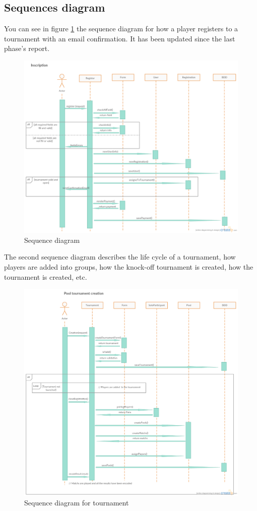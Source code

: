 \documentclass[a4paper, 12pt]{article}
\begin{document}
\subsection*{Sequences diagram}

You can see in figure \ref{playerseq} the sequence diagram for how a player registers to a tournament with an email confirmation. It has been updated since the last phase's report.

\begin{figure}[position]
   \caption{\label{playerseq} Sequence diagram}
  \includegraphics[scale=0.4]{Inscription.png}
\end{figure}

The second sequence diagram describes the life cycle of a tournament, how players are added into groups, how the knock-off tournament is created, how the tournament is created, etc. 

\begin{figure}[position]
   \caption{\label{tournseq} Sequence diagram for tournament}
  \includegraphics[scale=0.4]{Tournament.png}
\end{figure}
\end{document}
